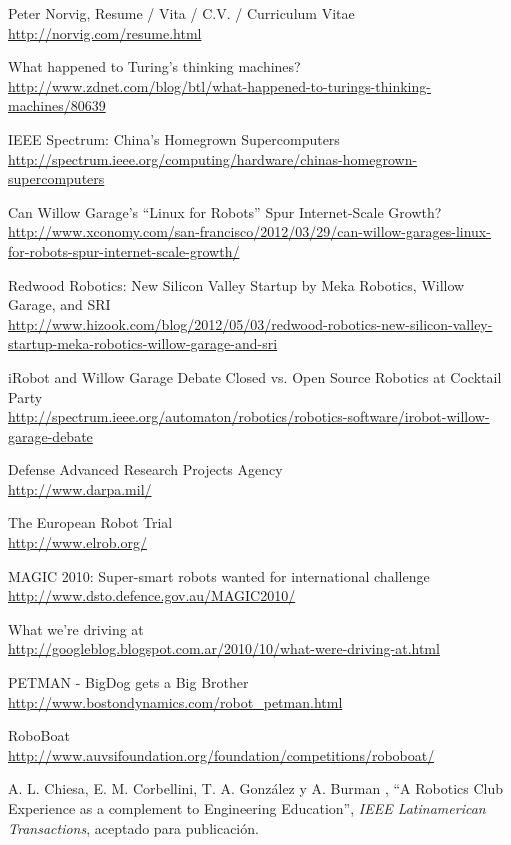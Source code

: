 \documentclass[a4paper,12pt]{article}
\begin{document}
\begin{thebibliography}{99}

Peter Norvig, Resume / Vita / C.V. / Curriculum Vitae \\
\url{http://norvig.com/resume.html}

What happened to Turing's thinking machines? \\
\url{http://www.zdnet.com/blog/btl/what-happened-to-turings-thinking-machines/80639}

IEEE Spectrum: China's Homegrown Supercomputers \\
\url{http://spectrum.ieee.org/computing/hardware/chinas-homegrown-supercomputers}

Can Willow Garage’s ``Linux for Robots'' Spur Internet-Scale Growth? \\
\url{http://www.xconomy.com/san-francisco/2012/03/29/can-willow-garages-linux-for-robots-spur-internet-scale-growth/}

Redwood Robotics: New Silicon Valley Startup by Meka Robotics, Willow Garage, and SRI \\
\url{http://www.hizook.com/blog/2012/05/03/redwood-robotics-new-silicon-valley-startup-meka-robotics-willow-garage-and-sri}

iRobot and Willow Garage Debate Closed vs. Open Source Robotics at Cocktail Party \\
\url{http://spectrum.ieee.org/automaton/robotics/robotics-software/irobot-willow-garage-debate}

Defense Advanced Research Projects Agency \\
\url{http://www.darpa.mil/}

The European Robot Trial \\
\url{http://www.elrob.org/}

MAGIC 2010: Super-smart robots wanted for international challenge \\
\url{http://www.dsto.defence.gov.au/MAGIC2010/}

What we're driving at \\
\url{http://googleblog.blogspot.com.ar/2010/10/what-were-driving-at.html}

PETMAN - BigDog gets a Big Brother \\
\url{http://www.bostondynamics.com/robot_petman.html}

RoboBoat \\
\url{http://www.auvsifoundation.org/foundation/competitions/roboboat/}

A. L. Chiesa, E. M. Corbellini, T. A. González y A. Burman , ``A Robotics Club Experience as a complement to Engineering Education'', \textit{IEEE Latinamerican Transactions}, aceptado para publicación.

\end{thebibliography}
\end{document}
